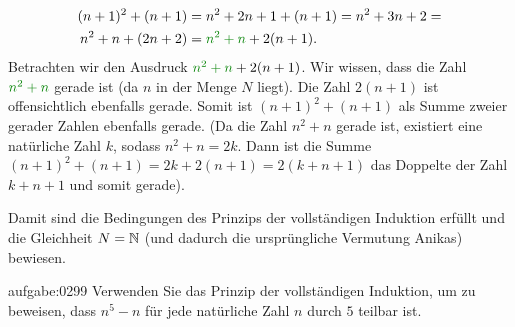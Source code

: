 {\begin{enumerate}
    \begin{align*}
        (n+1)^2+(n+1) &= n^2+2n+1+(n+1) = n^2+3n+2 =\\
        n^2+n + (2n+2) &= \textcolor{Green}{n^2+n} + 2(n+1).
    \end{align*}
    Betrachten wir den Ausdruck $\textcolor{Green}{n^2+n} + 2(n+1)$. Wir wissen, dass die Zahl $\textcolor{Green}{n^2+n}$ gerade ist (da $n$ in der Menge $N$ liegt). Die Zahl $2(n+1)$ ist offensichtlich ebenfalls gerade. Somit ist $(n+1)^2+(n+1)$ als Summe zweier gerader Zahlen ebenfalls gerade. (Da die Zahl $n^2+n$ gerade ist, existiert eine natürliche Zahl $k$, sodass $n^2+n = 2k$. Dann ist die Summe $(n+1)^2+(n+1) = 2k + 2(n+1) = 2(k+n+1)$ das Doppelte der Zahl $k+n+1$ und somit gerade). \checkmark
\end{enumerate}
Damit sind die Bedingungen des Prinzips der vollständigen Induktion erfüllt und die Gleichheit $N = \mathbb{N}$ (und dadurch die ursprüngliche Vermutung Anikas) bewiesen.
}

\begin{aufgabe}{aufgabe:0299}
Verwenden Sie das Prinzip der vollständigen Induktion, um zu beweisen, dass $n^5-n$ für jede natürliche Zahl $n$ durch $5$ teilbar ist.
\end{aufgabe}

